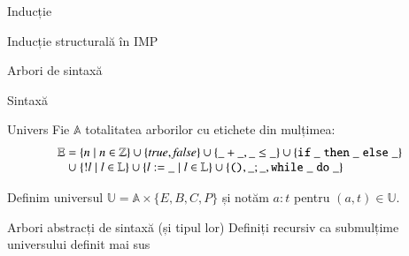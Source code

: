 \documentclass[xcolor=pdftex,romanian,colorlinks]{beamer}
\begin{document}
\begin{section}{Inducție}
\begin{subsection}{Inducție structurală în IMP}
\begin{frame}{Arbori de sintaxă}
\begin{block}{Sintaxă}
\vspace{-5ex}\begin{syntaxBlock}{\AExp}
\alert{
\begin{itemize}
\item[]\renewcommand{\syntaxKeyword}{}
\syntax{\Int\Smid\terminal{!}\Id \Smid \AExp\iop \AExp}{}
\item[]\renewcommand{\defSort}{\BExp}
\vspace{-3ex}\syntax{\Bool \Smid \AExp\bop \AExp}{}
\item[]\renewcommand{\defSort}{\Stmt}
\vspace{-3ex}\syntax{\Sskip \Smid \Id \terminal{:=} \AExp \Smid  \Stmt\terminal{;}\Stmt}{}
\syntaxCont{\Sif\BExp\Sthen \Block\Selse\Block \Smid \Swhile \BExp\Sdo \Block}{}
\item[]\renewcommand{\defSort}{\Pgm}
\vspace{-3ex}\syntax{\AExp \Smid \BExp \Smid \Stmt}{} 
\end{itemize}
}
\end{syntaxBlock}
\vspace{-2ex}
\end{block}

\begin{block}{Univers}
Fie $\mathbb{A}$ totalitatea arborilor cu etichete din mulțimea:
\vspace{-2ex}
\[\begin{array}{r@{\;}l}\mathbb{E} = & \{n\mid n\in\mathbb{Z}\} \cup \{\Strue, \Sfalse\}\cup \{\_+\_, \_\leq\_\} \cup \{\Sif\_\Sthen\_\Selse\_\}
\\ 
\cup &
\{! l \mid l\in  \mathbb{L}\}\cup \{l :=\_\mid l\in \mathbb{L}\}
\cup
\{\Sskip, \_;\_, \Swhile\_\Sdo\_\}
\end{array}\]

Definim universul $\mathbb{U} = \mathbb{A} \times \{E, B, C, P\}$ și notăm $a : t$ pentru $(a, t) \in \mathbb{U}$.
\end{block} 

\begin{block}{Arbori abstracți de sintaxă (și tipul lor)}
Definiți recursiv ca submulțime universului definit mai sus
\end{block}
\end{frame}


\end{subsection}
\end{section}
\end{document}

